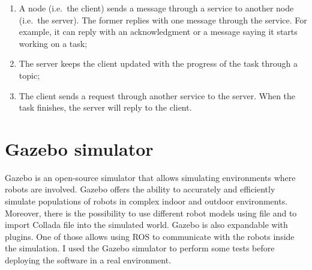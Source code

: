 \documentclass[../thesis.tex]{subfiles}
\begin{document}
\begin{itemize}
\begin{itemize}
\begin{enumerate}
                    \item A node (i.e.\ the client) sends a message through a service to another node (i.e.\ the server). The former replies with one message through the service. For example, it can reply with an acknowledgment or a message saying it starts working on a task;
                    \item The server keeps the client updated with the progress of the task through a topic;
                    \item The client sends a request through another service to the server. When the task finishes, the server will reply to the client.
                \end{enumerate}
        \end{itemize}
\end{itemize}

\section{Gazebo simulator}
Gazebo is an open-source simulator that allows simulating environments where robots are involved. Gazebo offers the ability to accurately and efficiently simulate populations of robots in complex indoor and outdoor environments. Moreover, there is the possibility to use different robot models using  file and to import Collada file into the simulated world. Gazebo is also expandable with plugins. One of those allows using \acrshort{ROS} to communicate with the robots inside the simulation. I used the Gazebo simulator to perform some tests before deploying the software in a real environment. 
\end{document}
